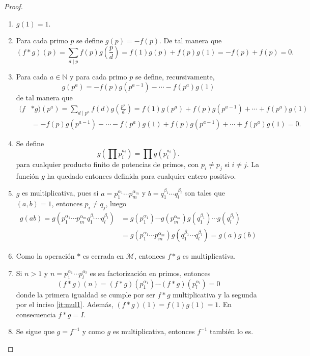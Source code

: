 \begin{proof}
\begin{enumerate}[label=\textnormal{(\arabic*)},ref=\textnormal{\arabic*}]
\item $g(1)=1$.
\item Para cada primo $p$ se define $g(p)=-f(p)$. De tal manera que
	\begin{equation*}
		(f*g)(p) = \sum_{d \mid p} f(p)g \left( \frac{p}{d} \right) = f(1)g(p) + f(p)g(1) = -f(p) + f(p) = 0.
	\end{equation*}
\item \label{it:mul1} Para cada $a \in \mathbb{N}$ y para cada primo $p$ se define, recursivamente,
	\begin{equation*}
	    g(p^a)=-f(p)g(p^{a-1})-\cdots-f(p^a)g(1)
	\end{equation*}
	de tal manera que 
	\begin{align*}
		(f&*g)(p^a) = \sum_{d \mid p^a} f(d)g \left( \frac{p^a}{d} \right) = f(1)g(p^a)+f(p)g(p^{a-1})+\cdots+f(p^a)g(1) \\
				   &= -f(p)g(p^{a-1})-\cdots-f(p^a)g(1)+f(p)g(p^{a-1})+\cdots+f(p^a)g(1) = 0.
	\end{align*}
\item Se define
	\begin{equation*}
	    g \left( \prod p_i^{a_i} \right) = \prod g(p_i^{a_i}).
	\end{equation*}
	para cualquier producto finito de potencias de primos, con $p_i \ne p_j$ si $i \ne j$. La función $g$ ha quedado entonces definida para cualquier entero positivo.
\item $g$ es multiplicativa, pues si $a=p_1^{\alpha_1}\cdots p_m^{\alpha_m}$ y $b=q_1^{\beta_1}\cdots q_l^{\beta_l}$ son tales que $(a,b)=1$, entonces $p_i \ne q_j$, luego
	\begin{align*}
		g(a b) = g(p_1^{\alpha_1}\cdots p_m^{\alpha_m} q_1^{\beta_1}\cdots q_l^{\beta_l}) &= g(p_1^{\alpha_1})\cdots g(p_m^{\alpha_m})g(q_1^{\beta_1})\cdots g(q_l^{\beta_l}) \\
																				 &= g(p_1^{\alpha_1}\cdots p_m^{\alpha_m})g(q_1^{\beta_1}\cdots q_l^{\beta_l}) = g(a)g(b)
	\end{align*}
\item Como la operación $*$ es cerrada en $\mathcal{M}$, entonces $f*g$ es multiplicativa.
\item Si $n>1$ y $n=p_1^{\alpha_1}\cdots p_l^{\alpha_l}$ es su factorización en primos, entonces
	\begin{equation*}
		(f*g)(n) = (f*g)(p_1^{\alpha_1})\cdots (f*g)(p_l^{\alpha_l}) = 0
	\end{equation*}
	donde la primera igualdad se cumple por ser $f*g$ multiplicativa y la segunda por el inciso \eqref{it:mul1}. Además, $(f*g)(1)=f(1)g(1)=1$. En consecuencia $f*g=I$.
\item Se sigue que $g=f^{-1}$ y como $g$ es multiplicativa, entonces $f^{-1}$ también lo es.
\end{enumerate}
\end{proof}

